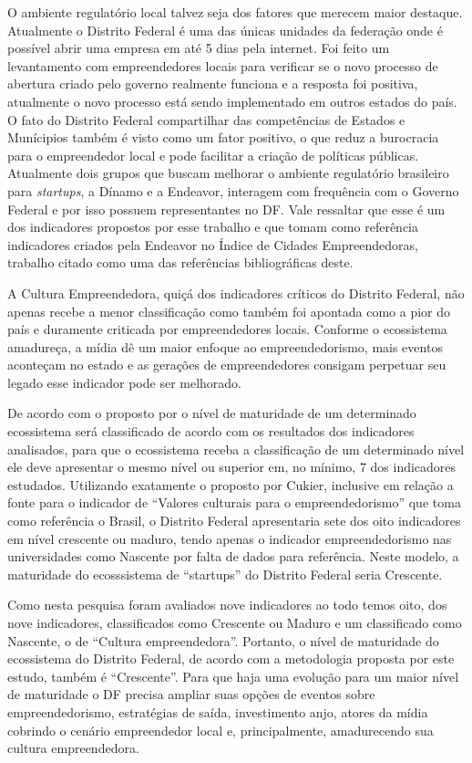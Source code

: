 O ambiente regulatório local talvez seja dos fatores que merecem maior destaque. Atualmente o Distrito Federal é uma das únicas unidades da federação onde é possível abrir uma empresa em até 5 dias pela internet. Foi feito um levantamento com empreendedores locais para verificar se o novo processo de abertura criado pelo governo realmente funciona e a resposta foi positiva, atualmente o novo processo está sendo implementado em outros estados do país. O fato do Distrito Federal compartilhar das competências de Estados e Munícipios também é visto como um fator positivo, o que reduz a burocracia para o empreendedor local e pode facilitar a criação de políticas públicas. Atualmente dois grupos que buscam melhorar o ambiente regulatório brasileiro para \textit{startups}, a Dínamo e a Endeavor, interagem com frequência com o Governo Federal e por isso possuem representantes no DF. Vale ressaltar que esse é um dos indicadores propostos por esse trabalho e que tomam como referência indicadores criados pela Endeavor no Índice de Cidades Empreendedoras, trabalho citado como uma das referências bibliográficas deste.

A Cultura Empreendedora, quiçá dos indicadores críticos do Distrito Federal, não apenas recebe a menor classificação como também foi apontada como a pior do país e duramente criticada por empreendedores locais. Conforme o ecossistema amadureça, a mídia dê um maior enfoque ao empreendedorismo, mais eventos aconteçam no estado e as gerações de empreendedores consigam perpetuar seu legado esse indicador pode ser melhorado.

De acordo com o proposto por  o nível de maturidade de um determinado ecossistema será classificado de acordo com os resultados dos indicadores analisados, para que o ecossistema receba a classificação de um determinado nível ele deve apresentar o mesmo nível ou superior em, no mínimo, 7 dos indicadores estudados. Utilizando exatamente o proposto por Cukier, inclusive em relação a fonte para o indicador de ``Valores culturais para o empreendedorismo'' que toma como referência o Brasil, o Distrito Federal apresentaria sete dos oito indicadores em nível crescente ou maduro, tendo apenas o indicador empreendedorismo nas universidades como Nascente por falta de dados para referência. Neste modelo, a maturidade do ecosssistema de ``startups'' do Distrito Federal seria Crescente.

Como nesta pesquisa foram avaliados nove indicadores ao todo temos oito, dos nove indicadores, classificados como Crescente ou Maduro e um classificado como Nascente, o de ``Cultura empreendedora''. Portanto, o nível de maturidade do ecossistema do Distrito Federal, de acordo com a metodologia proposta por este estudo, também é ``Crescente''. Para que haja uma evolução para um maior nível de maturidade o DF precisa ampliar suas opções de eventos sobre empreendedorismo, estratégias de saída, investimento anjo, atores da mídia cobrindo o cenário empreendedor local e, principalmente, amadurecendo sua cultura empreendedora.

